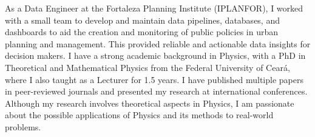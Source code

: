 \documentclass[10pt,a4paper,ragged2e,withhyper]{altacv}
\begin{document}
\makecvheader
{}\begin{justify}
\vspace{-0.3cm}
As a Data Engineer at the Fortaleza Planning Institute (IPLANFOR), I worked with a small team to develop and maintain data pipelines, databases, and dashboards to aid the creation and monitoring of public policies in urban planning and management. This provided reliable and actionable data insights for decision makers. I have a strong academic background in Physics, with a PhD in Theoretical and Mathematical Physics from the Federal University of Ceará, where I also taught as a Lecturer for 1.5 years. I have published multiple papers in peer-reviewed journals and presented my research at international conferences. Although my research involves theoretical aspects in Physics, I am passionate about the possible applications of Physics and its methods to real-world problems.
\end{justify}
\vspace{-0.3cm}
\end{document}
